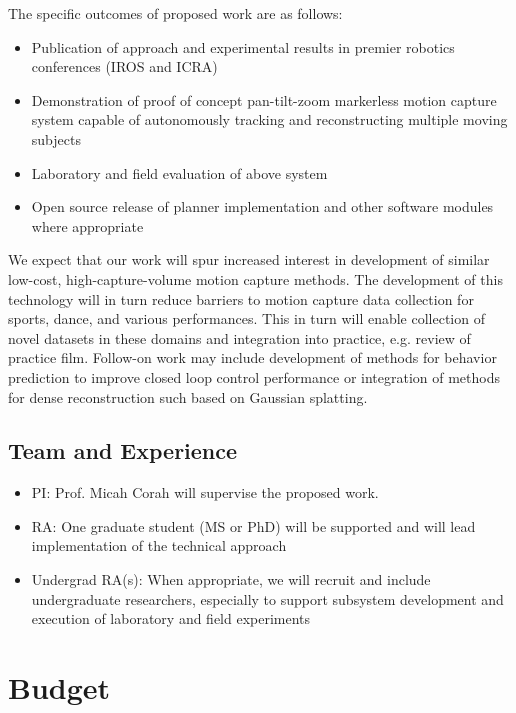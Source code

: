 \documentclass[11pt]{article}
\begin{document}
The specific outcomes of proposed work are as follows:
\begin{itemize}
  \item Publication of approach and experimental results in premier robotics
    conferences (IROS and ICRA)
  \item Demonstration of proof of concept pan-tilt-zoom markerless motion
    capture system capable of autonomously tracking and reconstructing multiple
    moving subjects
  \item Laboratory and field evaluation of above system
  \item Open source release of planner implementation and other software modules
    where appropriate
\end{itemize}
We expect that our work will spur increased interest in development of similar
low-cost, high-capture-volume motion capture methods.
The development of this technology will in turn reduce barriers to motion
capture data collection for sports, dance, and various performances.
This in turn will enable collection of novel datasets in these domains and
integration into practice, e.g. review of practice film.
Follow-on work may include development of methods for behavior prediction to
improve closed loop control performance or integration of methods for dense
reconstruction such based on Gaussian splatting.

\subsection{Team and Experience}

\begin{itemize}
  \item PI: Prof. Micah Corah will supervise the proposed work.
  \item RA: One graduate student (MS or PhD) will be supported and will lead
    implementation of the technical approach
  \item Undergrad RA(s): When appropriate, we will recruit and include
    undergraduate researchers, especially to support subsystem development and
    execution of laboratory and field experiments
\end{itemize}




\newpage
\section{Budget}
\end{document}
